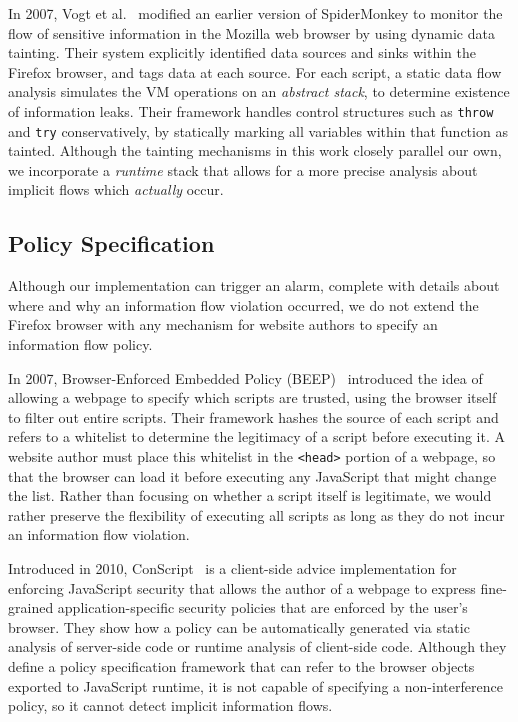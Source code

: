 In 2007, Vogt et al.~\cite{Vogt_CrossSiteScripting_2007} modified an earlier version of SpiderMonkey to monitor the flow of sensitive information in the Mozilla web browser by using dynamic data tainting.
Their system explicitly identified data sources and sinks within the Firefox browser, and tags data at each source.
For each script, a static data flow analysis simulates the VM operations on an \emph{abstract stack}, to determine existence of information leaks.
Their framework handles control structures such as \texttt{throw} and \texttt{try} conservatively, by statically marking all variables within that function as tainted.
Although the tainting mechanisms in this work closely parallel our own, we incorporate a \emph{runtime} stack that allows for a more precise analysis about implicit flows which \emph{actually} occur.

\subsection{Policy Specification}
\label{sec:policy_specification}

Although our implementation can trigger an alarm, complete with details about where and why an information flow violation occurred, we do not extend the Firefox browser with any mechanism for website authors to specify an information flow policy.

In 2007, Browser-Enforced Embedded Policy (BEEP)~\cite{beep} introduced the idea of allowing a webpage to specify which scripts are trusted, using the browser itself to filter out entire scripts.
Their framework hashes the source of each script and refers to a whitelist to determine the legitimacy of a script before executing it.
A website author must place this whitelist in the \texttt{<head>} portion of a webpage, so that the browser can load it before executing any JavaScript that might change the list.
Rather than focusing on whether a script itself is legitimate, we would rather preserve the flexibility of executing all scripts as long as they do not incur an information flow violation.

Introduced in 2010, ConScript~\cite{5504806} is a client-side advice implementation for enforcing JavaScript security that allows the author of a webpage to express fine-grained application-specific security policies that are enforced by the user's browser.
They show how a policy can be automatically generated via static analysis of server-side code or runtime analysis of client-side code.
Although they define a policy specification framework that can refer to the browser objects exported to JavaScript runtime, it is not capable of specifying a non-interference policy, so it cannot detect implicit information flows.

